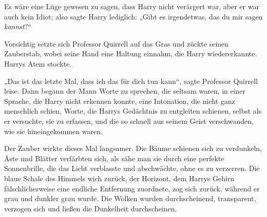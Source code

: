 Es wäre eine Lüge gewesen zu sagen, dass Harry nicht verärgert war, aber er war auch kein Idiot; also sagte Harry lediglich:
„Gibt es irgendetwas, das du mir sagen \emph{kannst}?“

Vorsichtig setzte sich Professor Quirrell auf das Gras und zückte seinen Zauberstab, wobei seine Hand eine Haltung einnahm, die Harry wiedererkannte. Harrys Atem stockte.

„Das ist das letzte Mal, dass ich das für dich tun kann“, sagte Professor Quirrell leise. Dann begann der Mann Worte zu sprechen, die seltsam waren, in einer Sprache, die Harry nicht erkennen konnte, eine Intonation, die nicht ganz menschlich schien, Worte, die Harrys Gedächtnis zu entgleiten schienen, selbst als er versuchte, sie zu erfassen, und die so schnell aus seinem Geist verschwanden, wie sie hineingekommen waren.

Der Zauber wirkte dieses Mal langsamer. Die Bäume schienen sich zu verdunkeln, Äste und Blätter verfärbten sich, als sähe man sie durch eine perfekte Sonnenbrille, die das Licht verblasste und abschwächte, ohne es zu verzerren. Die blaue Schale des Himmels wich zurück, der Horizont, dem Harrys Gehirn fälschlicherweise eine endliche Entfernung zuordnete, zog sich zurück, während er grau und dunkler grau wurde. Die Wolken wurden durchscheinend, transparent, verzogen sich und ließen die Dunkelheit durchscheinen.


